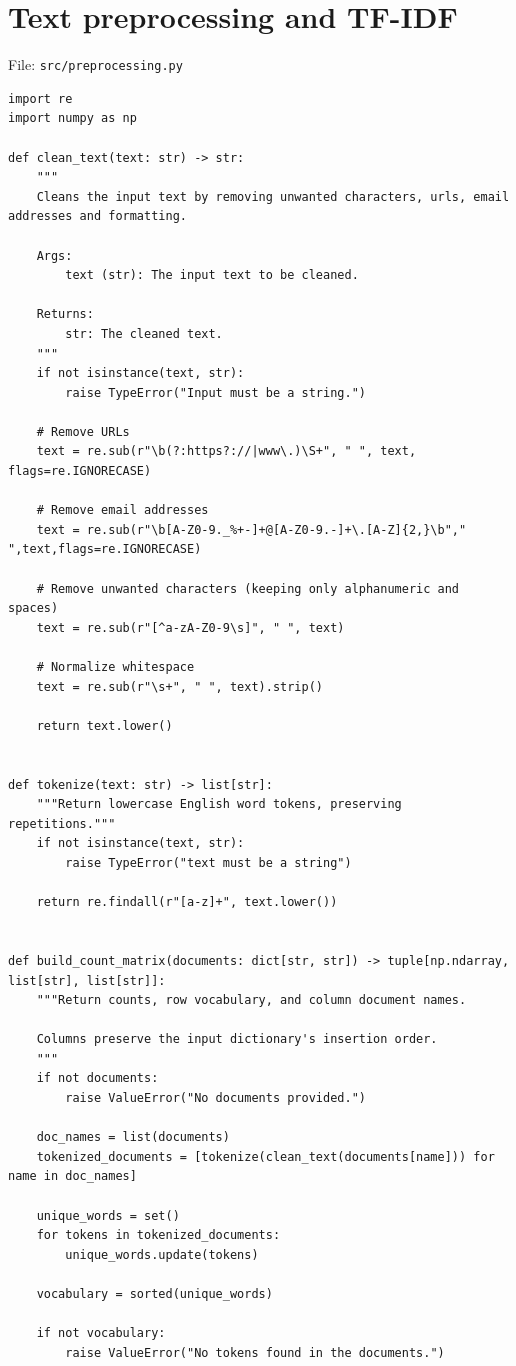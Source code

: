 \documentclass[12pt,a4paper]{report}
\theoremstyle{plain}
\theoremstyle{definition}
\theoremstyle{remark}
\theoremstyle{definition}
\begin{document}
\section{Text preprocessing and TF-IDF}
\noindent File: \texttt{src/preprocessing.py}
\begin{lstlisting}
import re
import numpy as np

def clean_text(text: str) -> str:
    """
    Cleans the input text by removing unwanted characters, urls, email addresses and formatting.

    Args:
        text (str): The input text to be cleaned.

    Returns:
        str: The cleaned text.
    """
    if not isinstance(text, str):
        raise TypeError("Input must be a string.")

    # Remove URLs
    text = re.sub(r"\b(?:https?://|www\.)\S+", " ", text, flags=re.IGNORECASE)

    # Remove email addresses
    text = re.sub(r"\b[A-Z0-9._%+-]+@[A-Z0-9.-]+\.[A-Z]{2,}\b"," ",text,flags=re.IGNORECASE)

    # Remove unwanted characters (keeping only alphanumeric and spaces)
    text = re.sub(r"[^a-zA-Z0-9\s]", " ", text)

    # Normalize whitespace
    text = re.sub(r"\s+", " ", text).strip()

    return text.lower()


def tokenize(text: str) -> list[str]:
    """Return lowercase English word tokens, preserving repetitions."""
    if not isinstance(text, str):
        raise TypeError("text must be a string")

    return re.findall(r"[a-z]+", text.lower())


def build_count_matrix(documents: dict[str, str]) -> tuple[np.ndarray, list[str], list[str]]:
    """Return counts, row vocabulary, and column document names.

    Columns preserve the input dictionary's insertion order.
    """
    if not documents:
        raise ValueError("No documents provided.")

    doc_names = list(documents)
    tokenized_documents = [tokenize(clean_text(documents[name])) for name in doc_names]

    unique_words = set()
    for tokens in tokenized_documents:
        unique_words.update(tokens)

    vocabulary = sorted(unique_words)

    if not vocabulary:
        raise ValueError("No tokens found in the documents.")


\end{lstlisting}
\end{document}
